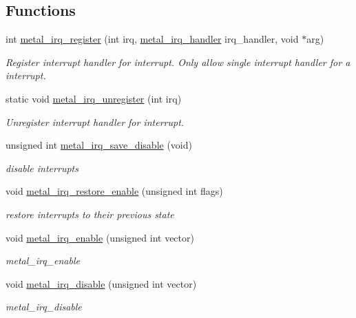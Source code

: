 \subsection*{Functions}
\begin{DoxyCompactItemize}
\item 
int \hyperlink{group__irq_ga825485f24670cd47ee1a9ef7ee469660}{metal\+\_\+irq\+\_\+register} (int irq, \hyperlink{group__irq_ga4fd6caa764267fc62373ae22e17aea2a}{metal\+\_\+irq\+\_\+handler} irq\+\_\+handler, void $\ast$arg)
\begin{DoxyCompactList}\small\item\em Register interrupt handler for interrupt. Only allow single interrupt handler for a interrupt. \end{DoxyCompactList}\item 
static void \hyperlink{group__irq_ga5a88b565896b06e7ce1fda23a8cb10c5}{metal\+\_\+irq\+\_\+unregister} (int irq)
\begin{DoxyCompactList}\small\item\em Unregister interrupt handler for interrupt. \end{DoxyCompactList}\item 
unsigned int \hyperlink{group__irq_ga79cd09db2f2ef9dd4c05117861f47066}{metal\+\_\+irq\+\_\+save\+\_\+disable} (void)
\begin{DoxyCompactList}\small\item\em disable interrupts \end{DoxyCompactList}\item 
void \hyperlink{group__irq_gaf39101252fba3dcefac3dd0f7919945f}{metal\+\_\+irq\+\_\+restore\+\_\+enable} (unsigned int flags)
\begin{DoxyCompactList}\small\item\em restore interrupts to their previous state \end{DoxyCompactList}\item 
void \hyperlink{group__irq_ga49be7c9623cd5bcb11c99542ee85bb97}{metal\+\_\+irq\+\_\+enable} (unsigned int vector)
\begin{DoxyCompactList}\small\item\em metal\+\_\+irq\+\_\+enable \end{DoxyCompactList}\item 
void \hyperlink{group__irq_ga51d9bee9f03e320423ced3ed60198a6a}{metal\+\_\+irq\+\_\+disable} (unsigned int vector)
\begin{DoxyCompactList}\small\item\em metal\+\_\+irq\+\_\+disable \end{DoxyCompactList}\item 

\end{DoxyCompactItemize}
